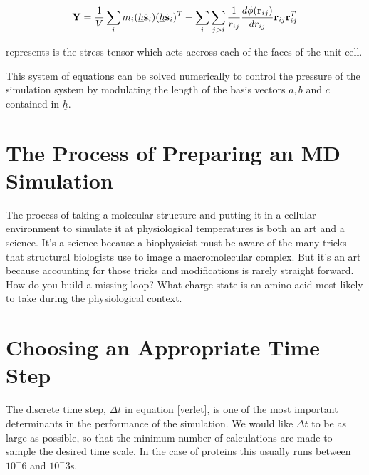 \begin{equation}
\begin{aligned}
	\bold{Y} = \frac{1}{V}\sum_i m_i (\underline{h}\dot{\bold{s}}_i) (\underline{h}\dot{\bold{s}}_i)^T + \sum_i \sum_{j>i}\frac{1}{{r}_{ij}} \frac{d \phi (\bold{r}_{ij})}{dr_{ij}} \bold{r}_{ij}\bold{r}_{ij}^T
\end{aligned}
\end{equation}

represents is the stress tensor which acts accross each of the faces of the unit cell. 

This system of equations can be solved numerically to control the pressure of the simulation system by modulating the length of the basis vectors $a, b$ and $c$ contained in $\underline{h}$.


\section{The Process of Preparing an MD Simulation}
The process of taking a molecular structure and putting it in a cellular environment to simulate it at physiological temperatures is both an art and a science. It's a science because a biophysicist must be aware of the many tricks that structural biologists use to image a macromolecular complex. But it's an art because accounting for those tricks and modifications is rarely straight forward. How do you build a missing loop? What charge state is an amino acid most likely to take during the physiological context.

\section{Choosing an Appropriate Time Step}
The discrete time step, $\Delta t$ in equation \ref{verlet}, is one of the most important determinants in the performance of the simulation. We would like $\Delta t$ to be as large as possible, so that the minimum number of calculations are made to sample the desired time scale. In the case of proteins this usually runs between $10^-6$ and $10^-3$s\cite{robustelli2022}.  

